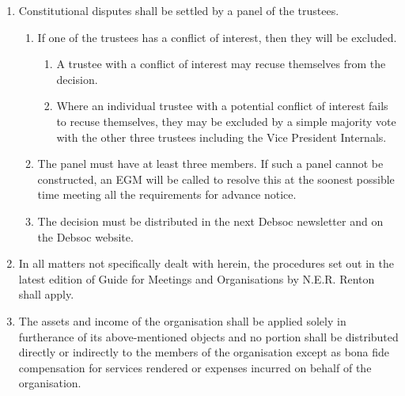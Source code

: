 \begin{enumerate}
    \item Constitutional disputes shall be settled by a panel of the trustees.
    \begin{enumerate}
        \item If one of the trustees has a conflict of interest, then they will be excluded.
        \begin{enumerate}
            \item A trustee with a conflict of interest may recuse themselves from the decision.
            \item Where an individual trustee with a potential conflict of interest fails to recuse themselves, they may be excluded by a simple majority vote with the other three trustees including the Vice President Internals.
        \end{enumerate}
        \item The panel must have at least three members. If such a panel cannot be constructed, an EGM will be called to resolve this at the soonest possible time meeting all the requirements for advance notice.
        \item The decision must be distributed in the next Debsoc newsletter and on the Debsoc website.
    \end{enumerate}
    \item In all matters not specifically dealt with herein, the procedures set out in the latest edition of Guide for Meetings and Organisations by N.E.R. Renton shall apply.
    \item The assets and income of the organisation shall be applied solely in furtherance of its above-mentioned objects and no portion shall be distributed directly or indirectly to the members of the organisation except as bona fide compensation for services rendered or expenses incurred on behalf of the organisation.
\end{enumerate}